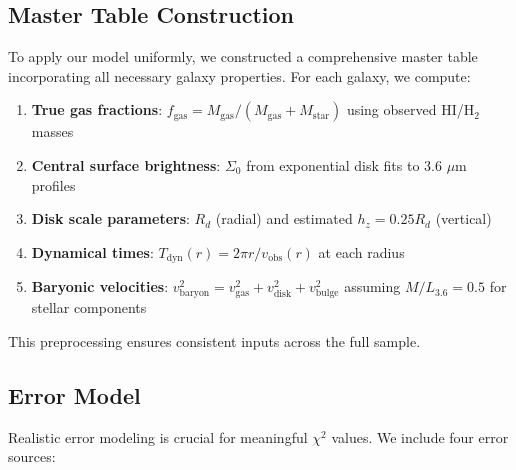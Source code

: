 \documentclass[twocolumn,prd,amsmath,amssymb,aps,superscriptaddress,nofootinbib]{revtex4-2}
\newcommand{\chisq}{\chi^2}
\begin{document}
\subsection{Master Table Construction}

To apply our model uniformly, we constructed a comprehensive master table incorporating all necessary galaxy properties. For each galaxy, we compute:

\begin{enumerate}
\item \textbf{True gas fractions}: $f_{\text{gas}} = M_{\text{gas}}/(M_{\text{gas}} + M_{\text{star}})$ using observed HI/H$_2$ masses
\item \textbf{Central surface brightness}: $\Sigma_0$ from exponential disk fits to 3.6 $\mu$m profiles
\item \textbf{Disk scale parameters}: $R_d$ (radial) and estimated $h_z = 0.25 R_d$ (vertical)
\item \textbf{Dynamical times}: $T_{\text{dyn}}(r) = 2\pi r/v_{\text{obs}}(r)$ at each radius
\item \textbf{Baryonic velocities}: $v_{\text{baryon}}^2 = v_{\text{gas}}^2 + v_{\text{disk}}^2 + v_{\text{bulge}}^2$ assuming $M/L_{3.6} = 0.5$ for stellar components
\end{enumerate}

This preprocessing ensures consistent inputs across the full sample.

\subsection{Error Model}

Realistic error modeling is crucial for meaningful $\chisq$ values. We include four error sources:
\end{document}
